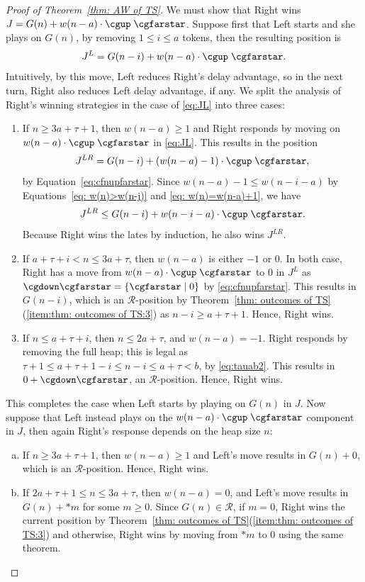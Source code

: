 \documentclass[oneside,reqno]{amsart}
\newcommand{\rp}{\mathscr{R}}
\begin{document}
\begin{proof}[Proof of Theorem~\ref{thm: AW of TS}]
     We must show that Right wins $J=G(n)+w(n-a)\cdot\cgup\;\cgfarstar$. Suppose first that Left starts and she plays on $G(n)$, by removing $1\le i\le a$ tokens, then the resulting position is 
    \begin{align}\label{eq:JL}
        J^L=G(n-i)+w(n-a)\cdot\cgup\;\cgfarstar. 
    \end{align}
    Intuitively, by this move, Left reduces Right's delay advantage, so in the next turn, Right also reduces Left delay advantage, if any. 
    We split the analysis of Right's winning strategies in the case of \eqref{eq:JL} into three cases:
    \begin{enumerate}
        \item If $n\ge 3a+\tau+1$, then $w(n-a)\ge 1$ and Right responds by moving on $w(n-a)\cdot\cgup\;\cgfarstar$ in \eqref{eq:JL}. This results in the position $$J^{LR}=G(n-i)+(w(n-a)-1)\cdot\cgup\;\cgfarstar,$$ by Equation~\eqref{eq:cfnupfarstar}. Since $w(n-a)-1\le w(n-i-a)$ by Equations~\eqref{eq: w(n)>w(n-j)} and \eqref{eq: w(n)=w(n-a)+1}, we have $$J^{LR}\le G(n-i)+w(n-i-a)\cdot\cgup\;\cgfarstar .$$ Because Right wins the lates by induction, he also wins $J^{LR}$.
        \item If $a+\tau+i<n\le 3a+\tau$, then $w(n-a)$ is either $-1$ or $0$. In both case, Right has a move from $w(n-a)\cdot\cgup\;\cgfarstar$ to $0$ in $J^L$ as $\cgdown\cgfarstar=\{\cgfarstar\mid 0\}$ by \eqref{eq:cfnupfarstar}. This results in $G(n-i)$, which is an $\rp$-position by Theorem~\ref{thm: outcomes of TS}(\ref{item:thm: outcomes of TS:3}) as $n-i\ge a+\tau+1$. Hence, Right wins.
        \item If $n\le a+\tau+i$, then $n\le 2a+\tau$,  and $w(n-a)=-1$. Right responds by removing the full heap; this is legal as $\tau+1\le a+\tau+1-i\le n-i\le a+\tau<b$, by \eqref{eq:tauab2}. This results in $0+\cgdown\cgfarstar$, an $\rp$-position. Hence, Right wins.
    \end{enumerate} 
    This completes the case when Left starts by playing on $G(n)$ in $J$. Now suppose that Left instead plays on the $w(n-a)\cdot\cgup\;\cgfarstar$ component in $J$, then again Right's response depends on the heap size $n$: 
    \begin{enumerate}[(a)]
        \item If $n\ge 3a+\tau+1$, then $w(n-a)\ge 1$ and Left's move results in $G(n)+0$, which is an $\rp$-position. Hence, Right wins. 
        \item\label{item:left play on up:2} If $2a+\tau+1\le n\le 3a+\tau$, then $w(n-a)=0$, and Left's move results in $G(n)+*m$ for some $m\ge 0$. Since $G(n)\in \rp$, if $m=0$, Right wins the current position by Theorem~\ref{thm: outcomes of TS}(\ref{item:thm: outcomes of TS:3}) and otherwise, Right wins by moving from $*m$ to $0$ using the same theorem.

\end{enumerate}
\end{proof}
\end{document}
